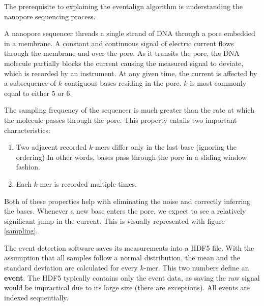 \documentclass[times, utf, seminar]{fer}
\begin{document}
The prerequisite to explaining the eventalign algorithm is understanding the nanopore
sequencing process.

A nanopore sequencer threads a single strand of DNA through a pore embedded in a membrane. A constant and continuous signal of electric current flows through the membrane and over the pore. As it transits the pore, the DNA molecule partially blocks the current causing the measured signal to deviate, which is recorded by an instrument. At any given time, the current
is affected by a subsequence of $k$ contiguous bases residing in the pore. $k$ is most commonly equal to either $5$ or $6$.

The sampling frequency of the sequencer is much greater than the rate at which the molecule passes through the pore.
This property entails two important characteristics:
\begin{enumerate}
	\item Two adjacent recorded $k$-mers differ only in the last base (ignoring the ordering) In other words, bases pass through the pore in a sliding window fashion.
	\item Each $k$-mer is recorded multiple times.
\end{enumerate}
Both of these properties help with eliminating the noise and correctly inferring the bases.
Whenever a new base enters the pore, we expect to see a relatively significant jump in the current. This is visually represented with figure \ref{sampling}.

The event detection software saves its measurements into a HDF5 file. With the assumption that all samples follow a normal distribution, the mean and the standard deviation are calculated for every $k$-mer. This two numbers define an \textbf{event}. The HDF5 typically contains only
the event data, as saving the raw signal would be impractical due to its large size (there are exceptions). All events are indexed sequentially.
\end{document}
